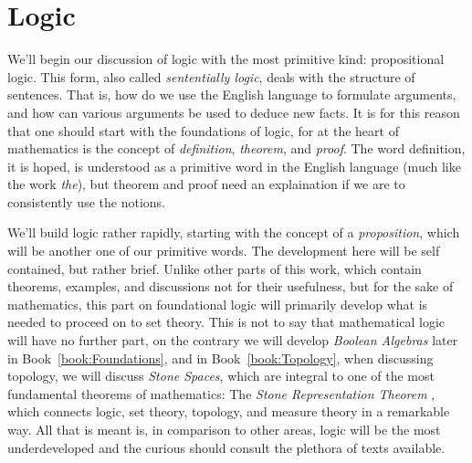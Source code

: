\begingroup
    \ifcsname\PATH\endcsname
        \newcommand{\PATH}{books/Foundations/Logic}
        \newcommand{\OLDPATH}{\PATH}
    \else
        \newcommand{\OLDPATH}{\PATH}
        \renewcommand{\PATH}{books/Foundations/Logic}
    \fi
    \chapter{Logic}
        \label{chapt:Propositional_Logic}%
        We'll begin our discussion of logic with the most primitive kind:
        propositional logic. This form, also called
        \textit{sententially logic}, deals with the
        structure of sentences. That is, how do we use the English language to
        formulate arguments, and how can various arguments be used to deduce new
        facts. It is for this reason that one should start with the foundations
        of logic, for at the heart of mathematics is the concept of
        \textit{definition}, \textit{theorem}, and \textit{proof}. The word
        definition, it is hoped, is understood as a primitive word in the
        English language (much like the work \textit{the}), but theorem and
        proof need an explaination if we are to consistently use the notions.
        \par\hfill\par
        We'll build logic rather rapidly, starting with the concept of a
        \textit{proposition}, which will be
        another one of our primitive words. The development here will be self
        contained, but rather brief. Unlike other parts of this work, which
        contain theorems, examples, and discussions not for their usefulness,
        but for the sake of mathematics, this part on foundational logic will
        primarily develop what is needed to proceed on to set theory. This is
        not to say that mathematical logic will have
        no further part, on the contrary we will develop
        \textit{Boolean Algebras} later in
        Book~\ref{book:Foundations}, and in Book~\ref{book:Topology}, when
        discussing topology, we will discuss
        \textit{Stone Spaces}, which are integral to one of
        the most fundamental theorems of mathematics: The
        \textit{Stone Representation Theorem}%
        , which connects logic, set theory,
        topology, and measure theory in a remarkable way. All that is meant is,
        in comparison to other areas, logic will be the most underdeveloped and
        the curious should consult the plethora of texts available.
        
        
        
    \renewcommand{\PATH}{\OLDPATH}
\endgroup